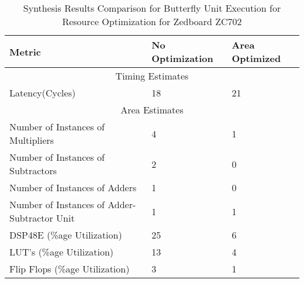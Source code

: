 \begin{table}[!h]
\centering
\caption{Synthesis Results Comparison for Butterfly Unit Execution for Resource Optimization for Zedboard ZC702}
\label{Table 4.1}
\begin{tabular}{||m{5.4cm}|m{4.2cm}|m{3cm}||}
\hline
Metric & No Optimization & Area Optimized  \\
\hline
\multicolumn{3}{||c||}{Timing Estimates}\\
\hline
Latency(Cycles) & 18 & 21\\
\hline
\multicolumn{3}{||c||}{Area Estimates}\\\cline{1-3}
Number of Instances of Multipliers & 4 & 1\\
\hline
Number of Instances of Subtractors & 2 & 0\\
\hline
Number of Instances of Adders & 1 & 0\\
\hline
Number of Instances of Adder-Subtractor Unit & 1 & 1\\
\hline
DSP48E (\%age Utilization) & 25 & 6\\
\hline
LUT's (\%age Utilization) &13 & 4\\
\hline
Flip Flops (\%age Utilization) & 3 & 1\\
\hline
\end{tabular}

\end{table}